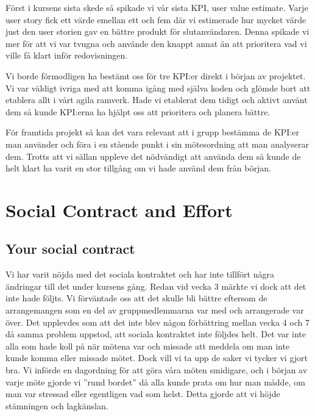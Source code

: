 \documentclass{scrartcl}
\begin{document}
Först i kursens sista skede så spikade vi vår sista KPI, user value estimate. Varje user story fick ett värde emellan ett och fem där vi estimerade hur mycket värde just den user storien gav en bättre produkt för slutanvändaren. Denna spikade vi mer för att vi var tvugna och använde den knappt annat än att prioritera vad vi ville få klart inför redovisningen. 

Vi borde förmodligen ha bestämt oss för tre KPI:er direkt i början av projektet. Vi var väldigt ivriga med att komma igång med själva koden och glömde bort att etablera allt i vårt agila ramverk. Hade vi etablerat dem tidigt och aktivt använt dem så kunde KPI:erna ha hjälpt oss att prioritera och planera bättre. 

För framtida projekt så kan det vara relevant att i grupp bestämma de KPI:er man använder och föra i en stående punkt i sin mötesordning att man analyserar dem. Trotts att vi sällan uppleve det nödvändigt att använda dem så kunde de helt klart ha varit en stor tillgång om vi hade använd dem från början. 





\section{Social Contract and Effort}\label{sec:social-contract-and-effort}
\subsection{Your social contract}

Vi har varit nöjda med det sociala kontraktet och har inte tillfört några ändringar till det under kursens gång. Redan vid vecka 3 märkte vi dock att det inte hade följts. Vi förväntade oss att det skulle bli bättre eftersom de arrangemangen som en del av gruppmedlemmarna var med och arrangerade var över. Det upplevdes som att det inte blev någon förbättring mellan vecka 4 och 7 då samma problem uppstod, att sociala kontraktet inte följdes helt. Det var inte alla som hade koll på när mötena var och missade att meddela om man inte kunde komma eller missade mötet. Dock vill vi ta upp de saker vi tycker vi gjort bra. Vi införde en dagordning för att göra våra möten smidigare, och i början av varje möte gjorde vi ''rund bordet'' då alla kunde prata om hur man mådde, om man var stressad eller egentligen vad som helst. Detta gjorde att vi höjde stämningen och lagkänslan.
\end{document}
